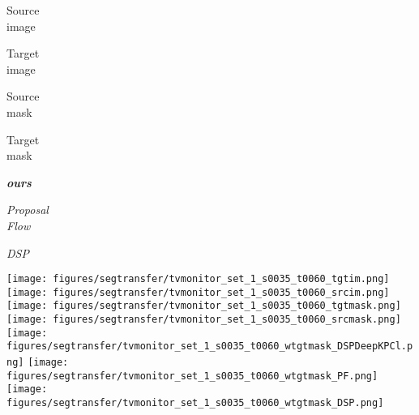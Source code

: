 \documentclass[10pt,twocolumn,letterpaper]{article}
\def\methodname{ANet\xspace}
\begin{document}
\begin{figure*}[t]
\begin{minipage}{0.538\linewidth}
\begin{center}

  \begin{minipage}[c]{\segtransferw\linewidth} \centering
  Source \\ image
  \end{minipage}
  \begin{minipage}[c]{\segtransferw\linewidth} \centering
  Target \\ image
  \end{minipage}
  \begin{minipage}[c]{\segtransferw\linewidth} \centering
  Source \\ mask
  \end{minipage}
  \begin{minipage}[c]{\segtransferw\linewidth} \centering
  Target \\ mask
  \end{minipage}
  \begin{minipage}[c]{\segtransferw\linewidth} \centering
  \textit{\textbf{ours}}
  \end{minipage}
  \begin{minipage}[c]{\segtransferw\linewidth} \centering
  \textit{Proposal \\ Flow} \cite{ham2016} %
  \end{minipage}
  \begin{minipage}[c]{\segtransferw\linewidth} \centering
  \textit{DSP} \cite{kim2013deformable} %
  \end{minipage}
  
  \texttt{[image: figures/segtransfer/tvmonitor\_set\_1\_s0035\_t0060\_tgtim.png]}
  \texttt{[image: figures/segtransfer/tvmonitor\_set\_1\_s0035\_t0060\_srcim.png]}
  \texttt{[image: figures/segtransfer/tvmonitor\_set\_1\_s0035\_t0060\_tgtmask.png]}
  \texttt{[image: figures/segtransfer/tvmonitor\_set\_1\_s0035\_t0060\_srcmask.png]}
  \texttt{[image: figures/segtransfer/tvmonitor\_set\_1\_s0035\_t0060\_wtgtmask\_DSPDeepKPCl.png]}
  \texttt{[image: figures/segtransfer/tvmonitor\_set\_1\_s0035\_t0060\_wtgtmask\_PF.png]}
  \texttt{[image: figures/segtransfer/tvmonitor\_set\_1\_s0035\_t0060\_wtgtmask\_DSP.png]}
\\


\end{center}
\end{minipage}
\end{figure*}
\end{document}
